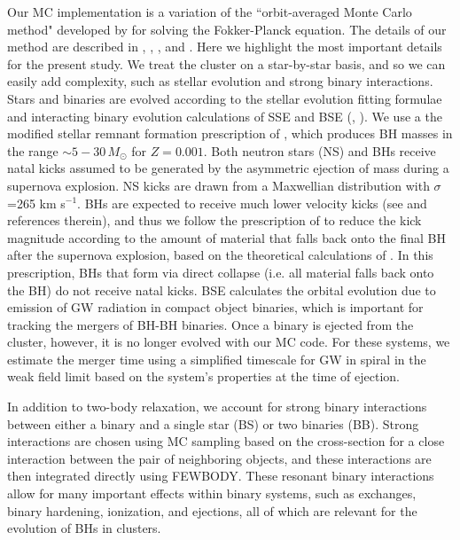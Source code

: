 \documentclass[12pt,preprint]{aastex}
\begin{document}
Our MC implementation is a variation of the ``orbit-averaged Monte Carlo 
method" developed by \cite{Henon1971a} for solving the Fokker-Planck 
equation. The details of our method are described in \citealt{Joshi2000}, 
\citealt{Joshi2001}, \citealt{Fregeau2003}, \citealt{Fregeau2007} and 
\citealt{Chatterjee2010}. Here we highlight the most important details for
the present study. We treat the cluster on a star-by-star basis, and so we
can easily add complexity, such as stellar evolution and strong binary 
interactions. Stars and binaries are evolved according to the stellar
evolution fitting formulae and interacting binary evolution calculations
of SSE and BSE (\citealt{Hurley2000}, \citealt{Hurley2002}). We use a 
the modified stellar remnant formation prescription of \cite{Belczynski2002}, 
which produces BH masses in the range $\sim 5-30\, M_\odot$ for $Z=0.001$. 
Both neutron stars (NS) and BHs receive natal kicks
assumed to be generated by the asymmetric ejection of mass during 
a supernova explosion. NS kicks are drawn from a Maxwellian
distribution with $\sigma$=265 km s$^{-1}$. BHs are expected to receive
much lower velocity kicks (see \citealt{Wong2012} and references therein),
and thus we follow the prescription of \cite{Belczynski2002} to reduce the
kick magnitude according to the amount of material that falls back onto the 
final BH after the supernova explosion, based on the theoretical calculations of 
\cite{Fryer2001}.  In this prescription, BHs that form via direct collapse 
 (i.e. all material falls back onto the BH) do not receive natal kicks.
BSE calculates the orbital evolution due to emission of GW radiation in compact
 object binaries, which is important for tracking the mergers of 
BH-BH binaries. Once a binary is ejected from the cluster, however, 
it is no longer evolved with our MC code.
For these systems, we estimate the merger time using a simplified timescale 
for GW in spiral in the weak field limit \citep{Peters1964} based on the system's
properties at the time of ejection.

In addition to two-body relaxation, we account for
strong binary interactions between either a binary and a single star (BS)
or two binaries (BB). Strong interactions are chosen using MC sampling
based on the cross-section for a close interaction between the pair of 
neighboring objects, and these interactions are then integrated 
directly using FEWBODY. These resonant binary interactions allow for many
important effects within binary systems, such as exchanges, binary hardening,
ionization, and ejections, all of which are relevant for the evolution of BHs in clusters.
\end{document}
